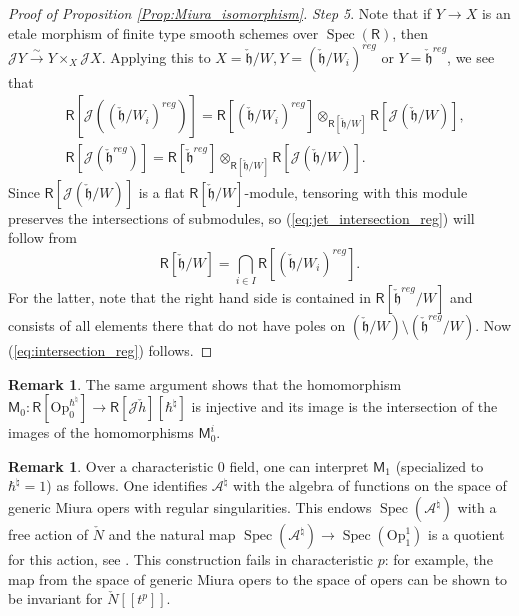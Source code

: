 \documentclass{amsart}
\theoremstyle{definition}
\newtheorem{Rem}[Thm]{Remark}
\newcommand{\on}{\mathrm}
\newcommand{\Ring}{\mathsf{R}}
\newcommand{\h}{\mathfrak{h}}
\newcommand{\A}{\mathscr{A}}
\newcommand{\Jet}{\mathscr{J}}
\newcommand{\Op}{\on{Op}}
\numberwithin{equation}{section}
\begin{document}
\begin{proof}[Proof of Proposition \ref{Prop:Miura_isomorphism}]
{\it Step 5}. Note that if $Y\rightarrow X$ is an etale morphism of finite type smooth schemes over $\operatorname{Spec}(\Ring)$, then 
$\Jet Y\xrightarrow{\sim} Y\times_X \Jet X$. Applying this to $X=\check{\h}/W, Y=(\check{\h}/W_i)^{reg}$ or $Y=\check{\h}^{reg}$,  
we see that 
\begin{align*}
&\Ring[\Jet((\check{\h}/W_i)^{reg})]=
\Ring[(\check{\h}/W_i)^{reg}]
\otimes_{\Ring[\check{\h}/W]}\Ring[\Jet(\check{\h}/W)], \\
&\Ring[\Jet(\check{\h}^{reg})]=\Ring[\check{\h}^{reg}]
\otimes_{\Ring[\check{\h}/W]}\Ring[\Jet(\check{\h}/W)].
\end{align*}
Since $\Ring[\Jet(\check{\h}/W)]$ is a flat $\Ring[\check{\h}/W]$-module, tensoring with this module preserves the intersections of submodules, so
(\ref{eq:jet_intersection_reg}) will follow from 
\begin{equation}\label{eq:intersection_reg}
\Ring[\check{\h}/W]=\bigcap_{i\in I}\Ring[(\check{\h}/W_i)^{reg}].
\end{equation}
For the latter, note that the right hand side is contained in 
$\Ring[\check{\h}^{reg}/W]$ and consists of all elements there that do not have poles on $(\check{\h}/W)\setminus (\check{\h}^{reg}/W)$. Now 
(\ref{eq:intersection_reg}) follows.
\end{proof}

\begin{Rem}\label{rem:Miura_general_k}
The same argument shows that the homomorphism $\mathsf{M}_0:\Ring[\Op^{\hbar^\natural}_0]\rightarrow \Ring[\Jet \check{h}][\hbar^\natural]$ is injective and its image is the intersection of the images of the homomorphisms $\mathsf{M}_0^i$.
\end{Rem}

\begin{Rem}
Over a characteristic $0$ field, one can interpret $\mathsf{M}_1$ (specialized to $\hbar^\natural=1$) as follows. One identifies $\A^\natural$ with the algebra of functions on the space of generic Miura opers with regular singularities. This endows $\operatorname{Spec}(\A^\natural)$ with a free action of $\check{N}$ 
and the natural map $\operatorname{Spec}(\A^\natural)\rightarrow \operatorname{Spec}(\Op^1_1)$ is a quotient for this action, see \cite[Section 8.2]{Frenkel_loop}. This construction fails in characteristic $p$: for example, 
the map from the space of generic Miura opers to the space of opers can be shown to be invariant for $\check{N}[[t^p]]$.
\end{Rem}
\end{document}
